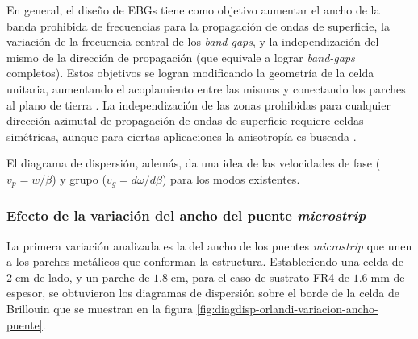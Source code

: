 En general, el diseño de EBGs tiene como objetivo aumentar el ancho de la banda prohibida de frecuencias para la propagación de ondas de superficie, la variación de la frecuencia central de los \textit{band-gaps}, y la independización del mismo de la dirección de propagación (que equivale a lograr \textit{band-gaps} completos). Estos objetivos se logran modificando la geometría de la celda unitaria, aumentando el acoplamiento entre las mismas y conectando los parches al plano de tierra \cite{Marcela:Tesis}. La independización de las zonas prohibidas para cualquier dirección azimutal de propagación de ondas de superficie requiere celdas simétricas, aunque para ciertas aplicaciones la anisotropía es buscada \cite{Maci:Pole-zero-matching}.

El diagrama de dispersión, además, da una idea de las velocidades de fase ($v_p = w/\beta$) y grupo ($v_g = d\omega / d\beta$) para los modos existentes.




\subsubsection{Efecto de la variación del ancho del puente \textit{microstrip}}

La primera variación analizada es la del ancho de los puentes \textit{microstrip} que unen a los parches metálicos que conforman la estructura. Estableciendo una celda de $2\;\text{cm}$ de lado, y un parche de $1.8\;\text{cm}$, para el caso de sustrato FR4 de $1.6\;\text{mm}$ de espesor, se obtuvieron los diagramas de dispersión sobre el borde de la celda de Brillouin que se muestran en la figura \ref{fig:diagdisp-orlandi-variacion-ancho-puente}.


